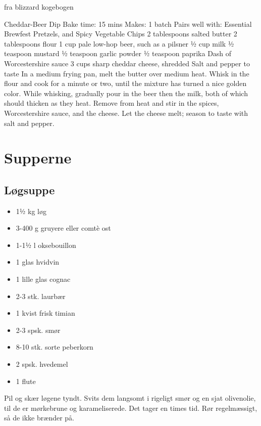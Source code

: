 \documentclass[
  letterpaper,
  DIV=11,
  numbers=noendperiod]{scrreprt}
\providecommand{\tightlist}{%
  \setlength{\itemsep}{0pt}\setlength{\parskip}{0pt}}\usepackage{longtable,booktabs,array}
\begin{document}
fra blizzard kogebogen

Cheddar-Beer Dip Bake time: 15 mins Makes: 1 batch Pairs well with:
Essential Brewfest Pretzels, and Spicy Vegetable Chips 2 tablespoons
salted butter 2 tablespoons flour 1 cup pale low-hop beer, such as a
pilsner ½ cup milk ½ teaspoon mustard ½ teaspoon garlic powder ½
teaspoon paprika Dash of Worcestershire sauce 3 cups sharp cheddar
cheese, shredded Salt and pepper to taste In a medium frying pan, melt
the butter over medium heat. Whisk in the flour and cook for a minute or
two, until the mixture has turned a nice golden color. While whisking,
gradually pour in the beer then the milk, both of which should thicken
as they heat. Remove from heat and stir in the spices, Worcestershire
sauce, and the cheese. Let the cheese melt; season to taste with salt
and pepper.


\hypertarget{supperne}{%
\chapter{Supperne}\label{supperne}}

\hypertarget{luxf8gsuppe}{%
\section{Løgsuppe}\label{luxf8gsuppe}}

\begin{itemize}
\tightlist
\item
  1½ kg løg
\item
  3-400 g gruyere eller comtè ost
\item
  1-1½ l oksebouillon
\item
  1 glas hvidvin
\item
  1 lille glas cognac
\item
  2-3 stk. laurbær
\item
  1 kvist frisk timian
\item
  2-3 spsk. smør
\item
  8-10 stk. sorte peberkorn
\item
  2 spsk. hvedemel
\item
  1 flute
\end{itemize}

Pil og skær løgene tyndt. Svits dem langsomt i rigeligt smør og en sjat
olivenolie, til de er mørkebrune og karameliserede. Det tager en times
tid. Rør regelmæssigt, så de ikke brænder på.
\end{document}
